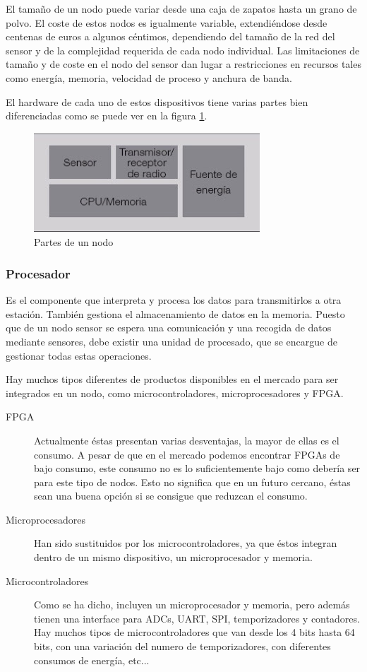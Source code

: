 El tama\~no de un nodo puede variar desde una caja de zapatos hasta un grano de polvo. El coste de estos nodos es
igualmente variable, extendi\'endose desde centenas de euros a algunos c\'entimos, dependiendo del tama\~no de la red del
sensor y de la complejidad requerida de cada nodo individual. Las limitaciones de tama\~no y de coste en el nodo del
sensor dan lugar a restricciones en recursos tales como energ\'ia, memoria, velocidad de proceso y anchura de banda.

El hardware de cada uno de estos dispositivos tiene varias partes bien diferenciadas como se puede ver en la figura \ref{fig:partes_nodo}.

\begin{figure}[htbp]
	\centering
		\includegraphics{imagenes/partes_nodo.jpg}
	\caption{Partes de un nodo}
	\label{fig:partes_nodo}
\end{figure}

 


\subsubsection{Procesador}
Es el componente que interpreta y procesa los datos para transmitirlos a otra estaci\'on. Tambi\'en gestiona el
almacenamiento de datos en la memoria. Puesto que de un nodo sensor se espera una comunicaci\'on y una recogida de datos
mediante sensores, debe existir una unidad de procesado, que se encargue de gestionar todas estas operaciones. 

Hay muchos tipos diferentes de productos disponibles en el mercado para ser integrados en un nodo, como
microcontroladores, microprocesadores y FPGA. 

\begin{description}
	\item[FPGA]
	Actualmente \'estas presentan varias desventajas, la mayor de ellas es el consumo. A pesar de que en el mercado
podemos encontrar FPGAs de bajo consumo, este consumo no es lo suficientemente bajo como deber\'ia ser para este tipo de
nodos. Esto no significa que en un futuro cercano, \'estas sean una buena opci\'on si se consigue que reduzcan el consumo.
	\item[Microprocesadores]
	Han sido sustituidos por los microcontroladores, ya que \'estos integran dentro de un mismo
dispositivo, un microprocesador y memoria.
	\item[Microcontroladores]
	Como se ha dicho, incluyen un microprocesador y memoria, pero adem\'as tienen una interface para
ADCs, UART, SPI, temporizadores y contadores. Hay muchos tipos de microcontroladores que van desde los 4 bits hasta 64
bits, con una variaci\'on del numero de temporizadores, con diferentes consumos de energ\'ia, etc...
\end{description}
 

